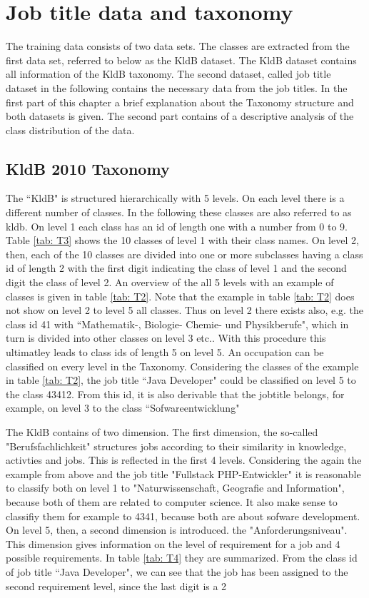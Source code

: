 \documentclass[12pt, a4paper, titlepage]{article}
\begin{document}
\section{Job title data and taxonomy}
The training data consists of two data sets. The classes are extracted from the first data set, referred to below as the \ac{KldB} dataset. The \ac{KldB} dataset contains all information of the \ac{KldB} taxonomy. The second dataset, called job title dataset in the following contains the necessary data from the job titles. In the first part of this chapter a brief explanation about the Taxonomy structure and both datasets is given. The second part contains of a descriptive analysis of the class distribution of the data. 

\subsection{KldB 2010 Taxonomy}
The ``\ac{KldB}" is structured hierarchically with 5 levels. On each level there is a different number of classes. In the following these classes are also referred to as kldb. On level 1 each class has an id of length one with a number from 0 to 9. Table \ref{tab: T3} shows the 10 classes of level 1 with their class names. On level 2, then, each of the 10 classes are divided into one or more subclasses having a class id of length 2 with the first digit indicating the class of level 1 and the second digit the class of level 2. An overview of the all 5 levels with an example of classes is given in table \ref{tab: T2}. Note that the example in table \ref{tab: T2} does not show on level 2 to level 5 all classes. Thus on level 2 there exists also, e.g. the class id 41 with ``Mathematik-, Biologie- Chemie- und Physikberufe", which in turn is divided into other classes on level 3 etc..  With this procedure this ultimatley leads to class ids of length 5 on level 5. An occupation can be classified on every level in the Taxonomy. Considering the classes of the example in table \ref{tab: T2}, the job title ``Java Developer" could  be classified on level 5 to the class 43412. From this id, it is also derivable that the jobtitle belongs, for example, on level 3 to the class ``Sofwareentwicklung" \citep{Bundesagentur2011a, Bundesagentur2011b, Paulus2013}

The \ac{KldB} contains of two dimension. The first dimension, the so-called "Berufsfachlichkeit" structures jobs according to their similarity in knowledge, activties and jobs. This is reflected in the first 4 levels. Considering the again the example from above and the job title "Fullstack PHP-Entwickler" it is reasonable to classify both on level 1 to "Naturwissenschaft, Geografie and Information", because both of them are related to computer science. It also make sense to classifiy them for example to 4341, because both are about sofware development. On level 5, then, a second dimension is introduced. the "Anforderungsniveau". This dimension gives information on the level of requirement for a job and 4 possible requirements. In table \ref{tab: T4} they are summarized. From the class id of job title ``Java Developer", we can see that the job has been assigned to the second requirement level, since the last digit is a 2 \citep{Bundesagentur2011a,Bundesagentur2011b,Paulus2013}
\end{document}
